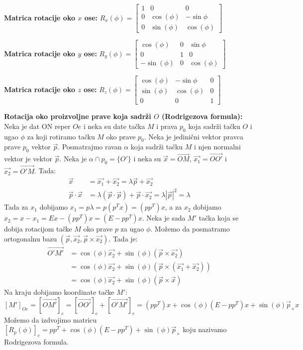 \documentclass[12pt]{article}
\newcommand{\vek}[1]{\overrightarrow{#1}}
\begin{document}
\textbf{Matrica rotacije oko $x$ ose:} $R_x(\phi)=\begin{bmatrix}
        1 & 0          & 0           \\
        0 & \cos(\phi) & -\sin{\phi} \\
        0 & \sin(\phi) & \cos(\phi)
    \end{bmatrix}$
\par
\textbf{Matrica rotacije oko $y$ ose:} $R_y(\phi)=\begin{bmatrix}
        \cos(\phi)  & 0 & \sin{\phi} \\
        0           & 1 & 0          \\
        -\sin(\phi) & 0 & \cos(\phi)
    \end{bmatrix}$
\par
\textbf{Matrica rotacije oko $z$ ose:} $R_z(\phi)=\begin{bmatrix}
        \cos(\phi) & -\sin{\phi} & 0 \\
        \sin(\phi) & \cos(\phi)  & 0 \\
        0          & 0           & 1
    \end{bmatrix}$
\par
\textbf{Rotacija oko proizvoljne prave koja sadrži $O$ (Rodrigezova formula):}
Neka je dat ON reper $Oe$ i neka su date tačka $M$ i prava $p_0$ koja sadrži
tačku $O$ i ugao $\phi$ za koji rotiramo tačku $M$ oko prave
$p_0$. Neka je jedinični vektor pravca prave $p_0$ vektor $\vek{p}$. Posmatrajmo
ravan $\alpha$ koja sadrži tačku $M$ i njen normalni vektor je vektor
$\vek{p}$. Neka je $\alpha\cap p_0 =\{O'\}$ i neka su $\vek{x}=\vek{OM}$,
$\vek{x_1}=\vek{OO'}$ i $\vek{x_2}=\vek{O'M}$. Tada:
\begin{align*}
    \vek{x}             & =\vek{x_1}+\vek{x_2} = \lambda\vek{p}+\vek{x_2}                                  \\
    \vek{p}\cdot\vek{x} & =\lambda(\vek{p}\cdot\vek{p})+\vek{p}\cdot\vek{x_2} =\lambda|\vek{p}|^2 =\lambda
\end{align*}
Tada za $x_1$ dobijamo $x_1=p\lambda=p(p^Tx)=(pp^T)x$, a za $x_2$ dobijamo
$x_2=x-x_1=Ex-(pp^T)x=(E-pp^T)x$. Neka je sada $M'$ tačka koja se dobija
rotacijom tačke $M$ oko prave $p$ za ugao $\phi$. Možemo da posmatramo
ortogonalnu bazu $(\vek{p},\vek{x_2},\vek{p}\times\vek{x_2})$. Tada je:
\begin{align*}
    \vek{O'M'} & =\cos(\phi)\vek{x_2}+\sin(\phi)(\vek{p}\times\vek{x_2})             \\
               & =\cos(\phi)\vek{x_2}+\sin(\phi)(\vek{p}\times(\vek{x_1}+\vek{x_2})) \\
               & =\cos(\phi)\vek{x_2}+\sin(\phi)(\vek{p}\times\vek{x})
\end{align*}
Na kraju dobijamo koordinate tačke $M'$:
$$[M']_{Oe}=[\vek{OM'}]_e=[\vek{OO'}]_e+[\vek{O'M'}]_e=(pp^T)x+\cos(\phi)(E-pp^T)x+\sin(\phi)\vek{p}_\times x$$
Možemo da izdvojimo matricu
$[R_p(\phi)]_e=pp^T+\cos(\phi)(E-pp^T)+\sin(\phi)\vek{p}_\times$
koju nazivamo Rodrigezova formula.
\par
\end{document}
